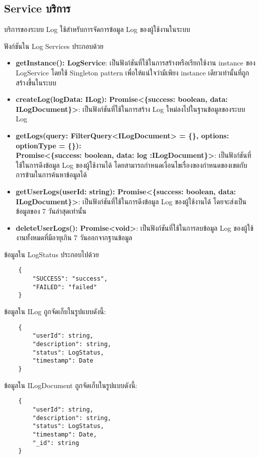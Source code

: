 \subsection{\ifenglish Service \else บริการ \fi}

\ifenglish
\else
บริการของระบบ Log ใช้สำหรับการจัดการข้อมูล Log ของผู้ใช้งานในระบบ 

ฟังก์ชันใน Log Services ประกอบด้วย
\begin{itemize}
    \item \textbf{getInstance(): LogService}: เป็นฟังก์ชันที่ใช้ในการสร้างหรือเรียกใช้งาน instance ของ \\LogService โดยใช้ Singleton pattern เพื่อให้แน่ใจว่ามีเพียง instance เดียวเท่านั้นที่ถูกสร้างขึ้นในระบบ
    \item \textbf{createLog(logData: ILog): Promise<\{success: boolean, data: ILogDocument\}>}: เป็นฟังก์ชันที่ใช้ในการสร้าง Log ใหม่ลงไปในฐานข้อมูลของระบบ Log
    \item \textbf{getLogs(query: FilterQuery<ILogDocument> = \{\}, options: optionType = \{\}): \\Promise<\{success: boolean, data: log :ILogDocument\}>}: เป็นฟังก์ชันที่ใช้ในการดึงข้อมูล Log ของผู้ใช้งานได้ โดยสามารถกำหนดเงื่อนไขเรื่องของกำหนดของเขตกับการข้ามในการค้นหาข้อมูลได้
    \item \textbf{getUserLogs(userId: string): Promise<\{success: boolean, data: ILogDocument\}>}: เป็นฟังก์ชันที่ใช้ในการดึงข้อมูล Log ของผู้ใช้งานได้ โดยจะส่งเป็นข้อมูลของ 7 วันล่าสุดเท่านั้น
    \item \textbf{deleteUserLogs(): Promise<void>}: เป็นฟังก์ชันที่ใช้ในการลบข้อมูล Log ของผู้ใช้งานทั้งหมดที่มีอายุเกิน 7 วันออกจากฐานข้อมูล
\end{itemize}

ข้อมูลใน LogStatus ประกอบไปด้วย
\begin{lstlisting}
    {
        "SUCCESS": "success",
        "FAILED": "failed"
    }
\end{lstlisting}

ข้อมูลใน ILog ถูกจัดเก็บในรูปแบบดังนี้:
\begin{lstlisting}
    {
        "userId": string,
        "description": string,
        "status": LogStatus,
        "timestamp": Date
    }
\end{lstlisting}

ข้อมูลใน ILogDocument ถูกจัดเก็บในรูปแบบดังนี้:
\begin{lstlisting}
    {
        "userId": string,
        "description": string,
        "status": LogStatus,
        "timestamp": Date,
        "_id": string
    }
\end{lstlisting}
\fi
